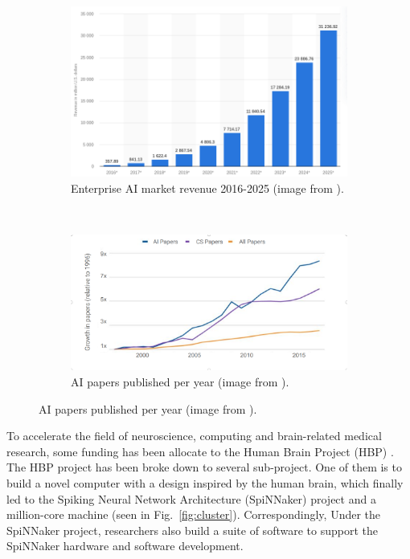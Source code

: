 \begin{figure}[!ht]
   \centering
   \begin{subfigure}[b]{0.5\textwidth}
       \includegraphics[width=\textwidth]{figures/ai_enterprise.png}
       \caption{Enterprise AI market revenue 2016-2025 (image from \cite{ai-proj}).}
       \label{fig:ai-proj}
   \end{subfigure}%
   ~
   \begin{subfigure}[b]{0.5\textwidth}
       \includegraphics[width=\textwidth]{figures/ai_paper.png}
       \caption{AI papers published per year (image from \cite{ai-papers}).}
       \label{fig:ai-papers}
   \end{subfigure}
\end{figure}

To accelerate the field of neuroscience, computing and brain-related medical research, some funding has been allocate to the Human Brain Project (HBP) \cite{hbp}. The HBP project has been broke down to several sub-project. One of them is to build a novel computer with a design inspired by the human brain, which finally led to the Spiking Neural Network Architecture (SpiNNaker) project and a million-core machine (seen in Fig.~\ref{fig:cluster}). Correspondingly, Under the SpiNNaker project, researchers also build a suite of software to support the SpiNNaker hardware and software development.\\

